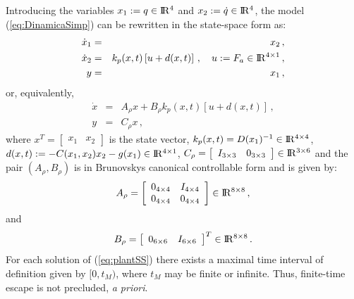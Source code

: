 \documentclass[letterpaper, 10 pt, conference]{ieeeconf}  %
\def\re{{\rm I}\! {\rm R}}
\theoremstyle{plain}
\theoremstyle{definition}
\theoremstyle{remark}
\begin{document}
Introducing the variables $x_1:=q \in \re^4$ and $x_2:=\dot{q}\in \re^4$, the model (\ref{eq:DinamicaSimp}) can be rewritten in the state-space form as:
%
\begin{eqnarray}
\dot{x}_1&=& x_2\,, \\
\dot{x}_2 &=& k_p(x,t) \left[u+d(x,t)\right]\,, \quad u:=F_a \in \re^{4 \times 1}\,,\\
y &=&  x_1\,,
\end{eqnarray}
%
or, equivalently, 
%
\begin{eqnarray}
\dot{x} &=& A_\rho x +  B_\rho k_p(x,t) [u + d(x,t)]\,, \label{eq:plantSS} \\
y &=& C_\rho x\,,\label{eq:plantSaida} 
\end{eqnarray}
%
where $x^T= \left [ \begin{array}{cc} x_1 & x_2\end{array} \right ]$ is the state vector, $k_p(x,t)=D(x_1)^{-1} \in \re^{4 \times 4}$, $d(x,t):=-C(x_1,x_2) x_2-g(x_1) \in \re^{4 \times 1}$, $C_\rho=\left[\begin{array}{cc} I_{3 \times 3} & 0_{3 \times 3}\end{array} \right] \in \re^{3 \times 6}$ and the pair $(A_\rho, B_\rho)$ is in Brunovskys canonical controllable form and is given by:
%
$$A_\rho=\left[\begin{array}{cccc} 0_{4 \times 4} & I_{4 \times 4}\\
0_{4 \times 4} & 0_{4 \times 4}\end{array} \right] \in \re^{8 \times 8}\,,$$
%
and
%
$$B_\rho=\left[\begin{array}{cc}  0_{6 \times 6} & I_{6 \times 6} \end{array} \right]^T \in \re^{8 \times 8}\,.$$
%
For each solution of (\ref{eq:plantSS}) there exists a maximal
time interval of definition given by $[0,t_M)$, where $t_M$ may be
finite or infinite. Thus, finite-time escape is not precluded, {\em
a priori}.

\medskip
\end{document}
